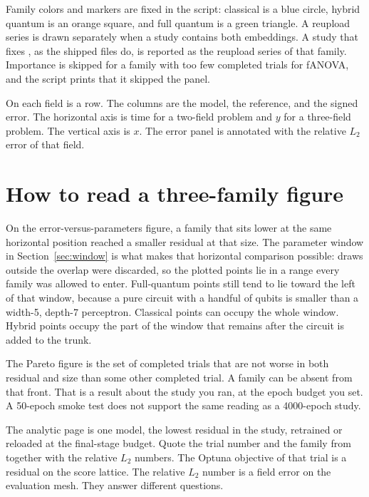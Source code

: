 Family colors and markers are fixed in the script: classical is a blue circle, hybrid quantum is an orange square, and full quantum is a green triangle.
A reupload series is drawn separately when a study contains both embeddings.
A study that fixes , as the shipped files do, is reported as the reupload series of that family.
Importance is skipped for a family with too few completed trials for fANOVA, and the script prints that it skipped the panel.

On  each field is a row.
The columns are the model, the reference, and the signed error.
The horizontal axis is time for a two-field problem and \(y\) for a three-field problem.
The vertical axis is \(x\).
The error panel is annotated with the relative \(L_{2}\) error of that field.

\section{How to read a three-family figure}

On the error-versus-parameters figure, a family that sits lower at the same horizontal position reached a smaller residual at that size.
The parameter window in Section~\ref{sec:window} is what makes that horizontal comparison possible: draws outside the overlap were discarded, so the plotted points lie in a range every family was allowed to enter.
Full-quantum points still tend to lie toward the left of that window, because a pure circuit with a handful of qubits is smaller than a width-5, depth-7 perceptron.
Classical points can occupy the whole window.
Hybrid points occupy the part of the window that remains after the circuit is added to the trunk.

The Pareto figure is the set of completed trials that are not worse in both residual and size than some other completed trial.
A family can be absent from that front.
That is a result about the study you ran, at the epoch budget you set.
A 50-epoch smoke test does not support the same reading as a 4000-epoch study.

The analytic page is one model, the lowest residual in the study, retrained or reloaded at the final-stage budget.
Quote the trial number and the family from  together with the relative \(L_{2}\) numbers.
The Optuna objective of that trial is a residual on the score lattice.
The relative \(L_{2}\) number is a field error on the evaluation mesh.
They answer different questions.
